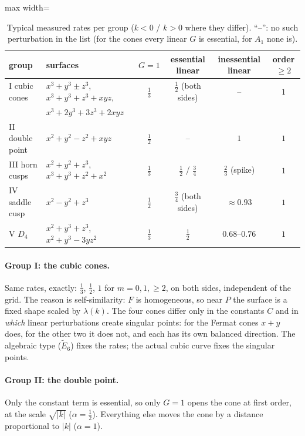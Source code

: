 \documentclass[12pt, a4paper]{article}
\theoremstyle{plain}
\theoremstyle{definition}
\theoremstyle{remark}
\theoremstyle{definition}
\begin{document}
\begin{table}[!h]
\centering
\small
\begin{adjustbox}{max width=\textwidth}
\begin{tabular}{l l c c c c}
\toprule
group & surfaces & $G=1$ & essential linear & inessential linear & order $\ge2$ \\
\midrule
I cubic cones & $x^3+y^3\pm z^3$, $x^3+y^3+z^3+xyz$, & $\tfrac13$ & $\tfrac12$ (both sides) & -- & $1$ \\
 & $x^3+2y^3+3z^3+2xyz$ & & & & \\
II double point & $x^2+y^2-z^2+xyz$ & $\tfrac12$ & -- & $1$ & $1$ \\
III horn cusps & $x^2+y^2+z^3$, $x^3+y^3+z^2+x^2$ & $\tfrac13$ & $\tfrac12$ / $\tfrac34$ & $\tfrac23$ (spike) & $1$ \\
IV saddle cusp & $x^2-y^2+z^3$ & $\tfrac12$ & $\tfrac34$ (both sides) & $\approx0.93$ & $1$ \\
V $D_4$ & $x^2+y^3+z^3$, $x^2+y^3-3yz^2$ & $\tfrac13$ & $\tfrac12$ & $0.68$--$0.76$ & $1$ \\
\bottomrule
\end{tabular}
\end{adjustbox}
\caption{Typical measured rates per group ($k<0$ / $k>0$ where they differ).
``--'': no such perturbation in the list (for the cones every linear $G$ is
essential, for $A_1$ none is).}
\label{tab:r-groups}
\end{table}

\paragraph{Group I: the cubic cones.} Same rates, exactly: $\tfrac13$, $\tfrac12$,
$1$ for $m=0,1,\ge2$, on both sides, independent of the grid. The reason is
self-similarity: $F$ is homogeneous, so near $P$ the surface is a fixed shape
scaled by $\lambda(k)$. The four cones differ only in the constants $C$ and in
\emph{which} linear perturbations create singular points: for the Fermat cones
$x+y$ does, for the other two it does not, and each has its own balanced direction.
The algebraic type ($\tilde E_6$) fixes the rates; the actual cubic curve fixes the
singular points.

\paragraph{Group II: the double point.} Only the constant term is essential, so
only $G=1$ opens the cone at first order, at the scale $\sqrt{|k|}$
($\alpha=\tfrac12$). Everything else moves the cone by a distance proportional to $|k|$ ($\alpha=1$).
\end{document}
